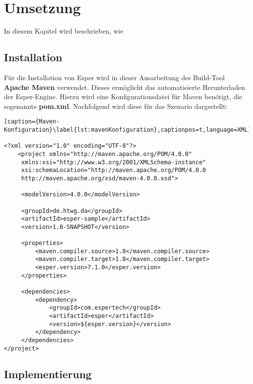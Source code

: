 \chapter{Umsetzung}
In diesem Kapitel wird beschrieben, wie
\section{Installation}
Für die Installation von Esper wird in dieser Ausarbeitung des Build-Tool \textbf{Apache Maven} verwendet. 
Dieses ermöglicht das automatisierte Herunterladen der Esper-Engine. Hierzu wird eine Konfigurationsdatei für Maven benötigt, die sogenannte \textbf{pom.xml}. Nachfolgend wird diese für das Szenario dargestellt:

\begin{lstlisting}[caption={Maven-Konfiguration}\label{lst:mavenKonfiguration},captionpos=t,language=XML]

<?xml version="1.0" encoding="UTF-8"?>
    <project xmlns="http://maven.apache.org/POM/4.0.0"
     xmlns:xsi="http://www.w3.org/2001/XMLSchema-instance"
     xsi:schemaLocation="http://maven.apache.org/POM/4.0.0
     http://maven.apache.org/xsd/maven-4.0.0.xsd">
		
     <modelVersion>4.0.0</modelVersion>

     <groupId>de.htwg.da</groupId>
     <artifactId>esper-sample</artifactId>
     <version>1.0-SNAPSHOT</version>

     <properties>
         <maven.compiler.source>1.8</maven.compiler.source>
         <maven.compiler.target>1.8</maven.compiler.target>
         <esper.version>7.1.0</esper.version>
     </properties>

     <dependencies>
         <dependency>
             <groupId>com.espertech</groupId>
             <artifactId>esper</artifactId>
             <version>${esper.version}</version>
         </dependency>
     </dependencies>
</project>
\end{lstlisting}

\section{Implementierung}
